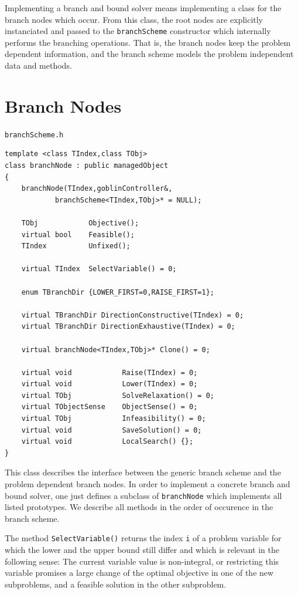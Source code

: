 \documentclass[a4paper,11pt,twoside]{book}
\begin{document}
\begin{multicols}{2}
Implementing a branch and bound solver means implementing a class for the
branch nodes which occur. From this class, the root nodes are explicitly
instanciated and passed to the \verb/branchScheme/ constructor which
internally performs the branching operations. That is, the branch nodes
keep the problem dependent information, and the branch scheme models the
problem independent data and methods.


\section{Branch Nodes}
\label{slb_bbnode}
\myinclude\verb/branchScheme.h/
\begin{mymethods}
\begin{verbatim}
template <class TIndex,class TObj>
class branchNode : public managedObject
{
    branchNode(TIndex,goblinController&,
            branchScheme<TIndex,TObj>* = NULL);

    TObj            Objective();
    virtual bool    Feasible();
    TIndex          Unfixed();

    virtual TIndex  SelectVariable() = 0;

    enum TBranchDir {LOWER_FIRST=0,RAISE_FIRST=1};

    virtual TBranchDir DirectionConstructive(TIndex) = 0;
    virtual TBranchDir DirectionExhaustive(TIndex) = 0;

    virtual branchNode<TIndex,TObj>* Clone() = 0;

    virtual void            Raise(TIndex) = 0;
    virtual void            Lower(TIndex) = 0;
    virtual TObj            SolveRelaxation() = 0;
    virtual TObjectSense    ObjectSense() = 0;
    virtual TObj            Infeasibility() = 0;
    virtual void            SaveSolution() = 0;
    virtual void            LocalSearch() {};
}
\end{verbatim}
\end{mymethods}
This class describes the interface between the generic branch scheme and the
problem dependent branch nodes. In order to implement a concrete branch and
bound solver, one just defines a subclass of \verb/branchNode/ which implements
all listed prototypes. We describe all methods in the order of occurence in the
branch scheme.

The method \verb/SelectVariable()/ returns the index \verb/i/ of a problem
variable for which the lower and the upper bound still differ and which is
relevant in the following sense: The current variable value is non-integral,
or restricting this variable promises a large change of the optimal objective 
in one of the new subproblems, and a feasible solution in the other subproblem.


\end{multicols}
\end{document}
